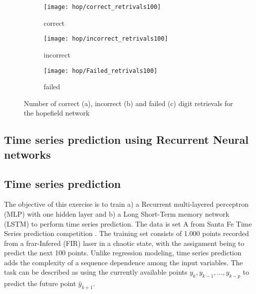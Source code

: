 \documentclass[conference,compsoc]{IEEEtran}
\begin{document}
        \begin{figure*}[]
        \centering
        \begin{subfigure}{0.30\linewidth}
            \texttt{[image: hop/correct\_retrivals100]}
            \caption{correct}
        \end{subfigure}
         \begin{subfigure}{0.30\linewidth}
            \texttt{[image: hop/incorrect\_retrivals100]}
            \caption{incorrect}
        \end{subfigure}  
        \begin{subfigure}{0.30\linewidth}
            \texttt{[image: hop/Failed\_retrivals100]}
            \caption{failed}
        \end{subfigure}
		        
        \caption{Number of correct (a), incorrect (b) and failed (c) digit retrievals for the hopefield network}
        \label{fig:hop2}
\end{figure*}






\subsection{Time series prediction using Recurrent Neural networks}


\subsection{Time series prediction}

The objective of this exercise is to train a) a Recurrent multi-layered perceptron (MLP) with one hidden layer and b) a Long Short-Term memory network (LSTM) to perform time series prediction. The data is set A from Santa Fe Time Series prediction competition \cite{santafe}. The training set consists of 1.000 points recorded from a frar-Infered (FIR) laser in a chaotic state, with the assignment being to predict the next 100 points. 
Unlike regression modeling, time series prediction adds the complexity of a sequence dependence among the input variables. The task can be described as using the currently available points $y_k,y_{k-1},...,y_{k-p}$ to predict the future point $\hat{y}_{k+1}$.
\end{document}

